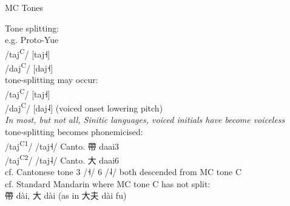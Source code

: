 \documentclass{beamer}
\begin{document}
\begin{frame}[fragile]{MC Tones}

Tone splitting:\\ 
e.g. Proto-Yue\\
/taj\textsuperscript{C}/ [taj˧]\\
/daj\textsuperscript{C}/ [daj˧]\\
\medskip
tone-splitting may occur:\\
/taj\textsuperscript{C}/ [taj˧]\\
/daj\textsuperscript{C}/ [daj˨] {\scriptsize (voiced onset lowering pitch)}\\
\medskip
\textit{\scriptsize In most, but not all, Sinitic languages, voiced initials have become voiceless}\\
tone-splitting becomes phonemicised:\\
/taj\textsuperscript{C1}/ /taj˧/ Canto. 帶 daai3\\
/taj\textsuperscript{C2}/ /taj˨/ Canto. 大 daai6\\
\medskip
cf. Cantonese tone 3 /˧/ 6 /˨/ both descended from MC tone C\\
cf. Standard Mandarin where MC tone C has not split:\\
\quad 帶 dài, 大 dài (as in 大夫 dài fu)

\end{frame}
\end{document}
